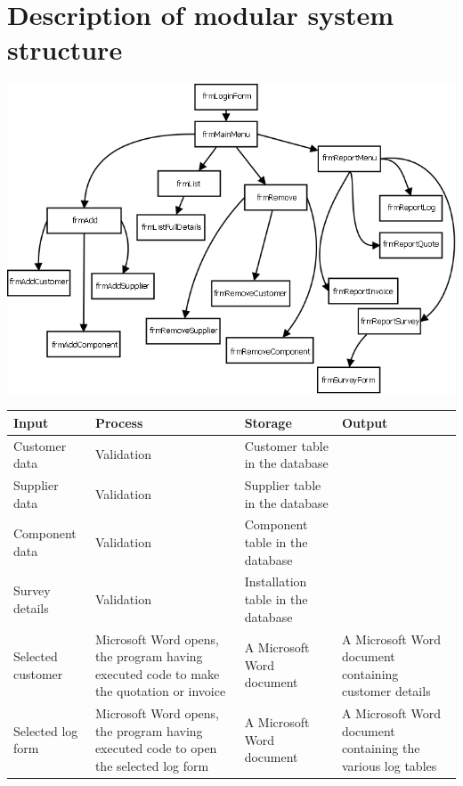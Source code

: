 	\section{Description of modular system structure}
\begin{center}
	\includegraphics[scale=0.5]{hcfinal}
\end{center}
	\begin{center}
		\begin{tabular}{| p{4cm} | p{4cm} | p{4cm} | p{4cm} | }
			\hline
			\textbf{Input} & \textbf{Process} & \textbf{Storage} & \textbf{Output}\\
			\hline
			Customer data & Validation & Customer table in the database & \\
			\hline
			Supplier data & Validation & Supplier table in the database & \\
			\hline
			Component data & Validation & Component table in the database & \\
			\hline
			Survey details & Validation & Installation table in the database & \\
			\hline
			Selected customer & Microsoft Word opens, the program having executed code to make the quotation or invoice & A Microsoft Word document & A Microsoft Word document containing customer details\\
			\hline
			Selected log form & Microsoft Word opens, the program having executed code to open the selected log form & A Microsoft Word document & A Microsoft Word document containing the various log tables\\
			\hline
		\end{tabular}
	\end{center}
